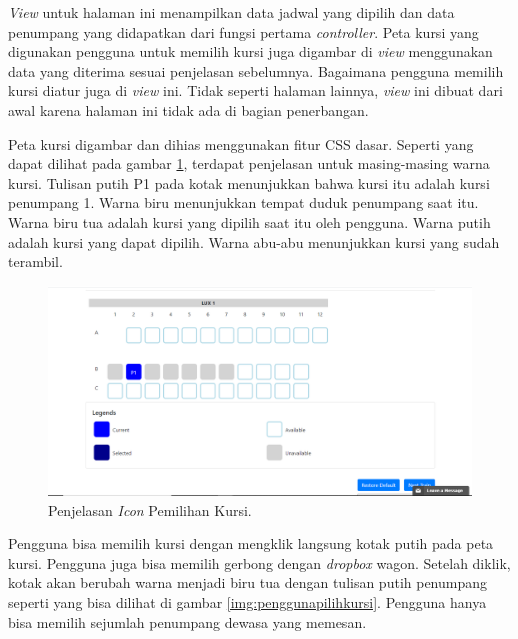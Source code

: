 \textit{View} untuk halaman ini menampilkan data jadwal yang dipilih dan data penumpang yang didapatkan dari fungsi pertama \textit{controller}. Peta kursi yang digunakan pengguna untuk memilih kursi juga digambar di \textit{view} menggunakan data yang diterima sesuai penjelasan sebelumnya. Bagaimana pengguna memilih kursi diatur juga di \textit{view} ini. Tidak seperti halaman lainnya, \textit{view} ini dibuat dari awal karena halaman ini tidak ada di bagian penerbangan.

Peta kursi digambar dan dihias menggunakan fitur CSS dasar. Seperti yang dapat dilihat pada gambar \ref{img:legendsseat}, terdapat penjelasan untuk masing-masing warna kursi. Tulisan putih P1 pada kotak menunjukkan bahwa kursi itu adalah kursi penumpang 1. Warna biru menunjukkan tempat duduk penumpang saat itu. Warna biru tua adalah kursi yang dipilih saat itu oleh pengguna. Warna putih adalah kursi yang dapat dipilih. Warna abu-abu menunjukkan kursi yang sudah terambil.

\begin{figure}[H]
        \center
        \includegraphics[width=\textwidth,height=\textheight,keepaspectratio]{Gambar/Legends Seat Selection.png}
        \caption{Penjelasan \textit{Icon} Pemilihan Kursi.}
            \label{img:legendsseat}
        \end{figure}

Pengguna bisa memilih kursi dengan mengklik langsung kotak putih pada peta kursi. Pengguna juga bisa memilih gerbong dengan \textit{dropbox} wagon. Setelah diklik, kotak akan berubah warna menjadi biru tua dengan tulisan putih penumpang seperti yang bisa dilihat di gambar \ref{img:penggunapilihkursi}. Pengguna hanya bisa memilih sejumlah penumpang dewasa yang memesan. 

